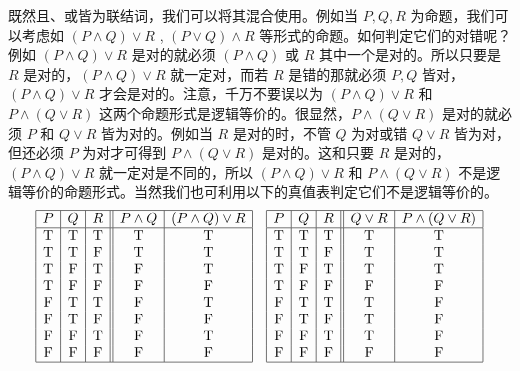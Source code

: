 既然且、或皆为联结词，我们可以将其混合使用。例如当 \(P,Q,R\) 为命题，我们可以考虑如 \((P\land Q)\lor R\) , \((P\lor Q)\land R\)  等形式的命题。如何判定它们的对错呢？例如 \((P\land Q)\lor R\) 是对的就必须 \((P\land Q)\) 或 \(R\) 其中一个是对的。所以只要是 \(R\) 是对的，\((P\land Q)\lor R\) 就一定对，而若 \(R\) 是错的那就必须 \(P,Q\) 皆对，\((P\land Q)\lor R\) 才会是对的。注意，千万不要误以为 \((P\land Q)\lor R\) 和 \(P\land (Q\lor R)\) 这两个命题形式是逻辑等价的。很显然，\(P\land (Q\lor R)\) 是对的就必须 \(P\) 和 \(Q\lor R\) 皆为对的。例如当 \(R\) 是对的时，不管 \(Q\) 为对或错 \(Q\lor R\) 皆为对，但还必须 \(P\) 为对才可得到 \(P\land (Q\lor R)\) 是对的。这和只要 \(R\) 是对的，\((P\land Q)\lor R\) 就一定对是不同的，所以 \((P\land Q)\lor R\) 和 \(P\land (Q\lor R)\) 不是逻辑等价的命题形式。当然我们也可利用以下的真值表判定它们不是逻辑等价的。
\[
\begin{array}{|c|c|c||c|c|}
\hline
P & Q & R & P\land Q & (P\land Q)\lor R \\
\hline
\mathrm{T} & \mathrm{T} & \mathrm{T} & \mathrm{T} & \mathrm{T}  \\
\mathrm{T} & \mathrm{T} & \mathrm{F} & \mathrm{T} & \mathrm{T} \\
\mathrm{T} & \mathrm{F} & \mathrm{T} & \mathrm{F} & \mathrm{T} \\
\mathrm{T} & \mathrm{F} & \mathrm{F} & \mathrm{F} & \mathrm{F} \\
\mathrm{F} & \mathrm{T} & \mathrm{T} & \mathrm{F} & \mathrm{T}  \\
\mathrm{F} & \mathrm{T} & \mathrm{F} & \mathrm{F} & \mathrm{F} \\
\mathrm{F} & \mathrm{F} & \mathrm{T} & \mathrm{F} & \mathrm{T}  \\
\mathrm{F} & \mathrm{F} & \mathrm{F} & \mathrm{F} & \mathrm{F}  \\
\hline
\end{array}
\quad
\begin{array}{|c|c|c||c|c|}
\hline
P & Q & R & Q\lor R & P\land (Q\lor R) \\
\hline
 \mathrm{T} & \mathrm{T} & \mathrm{T} & \mathrm{T} & \mathrm{T} \\
 \mathrm{T} & \mathrm{T} & \mathrm{F} & \mathrm{T} & \mathrm{T} \\
 \mathrm{T} & \mathrm{F} & \mathrm{T} & \mathrm{T} & \mathrm{T} \\
 \mathrm{T} & \mathrm{F} & \mathrm{F} & \mathrm{F} & \mathrm{F} \\
 \mathrm{F} & \mathrm{T} & \mathrm{T} & \mathrm{T} & \mathrm{F} \\
 \mathrm{F} & \mathrm{T} & \mathrm{F} & \mathrm{T} & \mathrm{F} \\
 \mathrm{F} & \mathrm{F} & \mathrm{T} & \mathrm{T} & \mathrm{F} \\
 \mathrm{F} & \mathrm{F} & \mathrm{F} & \mathrm{F} & \mathrm{F} \\
\hline
\end{array}
\]

